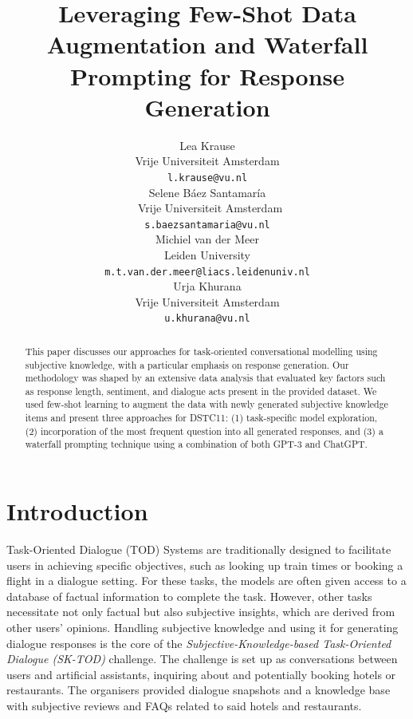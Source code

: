 \documentclass[11pt]{article}
\title{Leveraging Few-Shot Data Augmentation and Waterfall Prompting for Response Generation} %
\author{
  Lea Krause \\
  Vrije Universiteit Amsterdam \\
  \texttt{l.krause@vu.nl} \\ \And
  Selene Báez Santamaría \\ \
  Vrije Universiteit Amsterdam \\
  \texttt{s.baezsantamaria@vu.nl} \\ \AND
  Michiel van der Meer \\ Leiden University \\
  \texttt{m.t.van.der.meer@liacs.leidenuniv.nl} \\ \And
  Urja Khurana \\
  Vrije Universiteit Amsterdam \\
  \texttt{u.khurana@vu.nl}\\
}
\begin{document}
\maketitle
\begin{abstract}
This paper discusses our approaches for task-oriented conversational modelling using subjective knowledge, with a particular emphasis on response generation.
Our methodology was shaped by an extensive data analysis that evaluated key factors such as response length, sentiment, and dialogue acts present in the provided dataset. We used few-shot learning to augment the data with newly generated subjective knowledge items and present three approaches for DSTC11: (1) task-specific model exploration, (2) incorporation of the most frequent question into all generated responses, and (3) a waterfall prompting technique using a combination of both GPT-3 and ChatGPT.
\end{abstract}

\section{Introduction}
Task-Oriented Dialogue (TOD) Systems are traditionally designed to facilitate users in achieving specific objectives, such as looking up train times or booking a flight in a dialogue setting. For these tasks, the models are often given access to a database of factual information to complete the task. However, other tasks necessitate not only factual but also subjective insights, which are derived from other users' opinions. Handling subjective knowledge and using it for generating dialogue responses is the core of the \textit{Subjective-Knowledge-based Task-Oriented Dialogue (SK-TOD)} \cite{zhao2023others} challenge. The challenge is set up as conversations between users and artificial assistants, inquiring about and potentially booking hotels or restaurants. The organisers provided dialogue snapshots and a knowledge base with subjective reviews and FAQs related to said hotels and restaurants.
\end{document}
